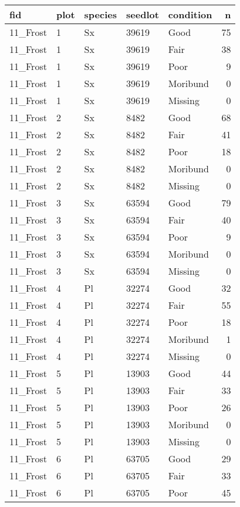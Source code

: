 \documentclass[
]{article}
\begin{document}
\begin{tabular}{l|l|l|l|l|r}
\hline
fid & plot & species & seedlot & condition & n\\
\hline
11\_Frost & 1 & Sx & 39619 & Good & 75\\
\hline
11\_Frost & 1 & Sx & 39619 & Fair & 38\\
\hline
11\_Frost & 1 & Sx & 39619 & Poor & 9\\
\hline
11\_Frost & 1 & Sx & 39619 & Moribund & 0\\
\hline
11\_Frost & 1 & Sx & 39619 & Missing & 0\\
\hline
11\_Frost & 2 & Sx & 8482 & Good & 68\\
\hline
11\_Frost & 2 & Sx & 8482 & Fair & 41\\
\hline
11\_Frost & 2 & Sx & 8482 & Poor & 18\\
\hline
11\_Frost & 2 & Sx & 8482 & Moribund & 0\\
\hline
11\_Frost & 2 & Sx & 8482 & Missing & 0\\
\hline
11\_Frost & 3 & Sx & 63594 & Good & 79\\
\hline
11\_Frost & 3 & Sx & 63594 & Fair & 40\\
\hline
11\_Frost & 3 & Sx & 63594 & Poor & 9\\
\hline
11\_Frost & 3 & Sx & 63594 & Moribund & 0\\
\hline
11\_Frost & 3 & Sx & 63594 & Missing & 0\\
\hline
11\_Frost & 4 & Pl & 32274 & Good & 32\\
\hline
11\_Frost & 4 & Pl & 32274 & Fair & 55\\
\hline
11\_Frost & 4 & Pl & 32274 & Poor & 18\\
\hline
11\_Frost & 4 & Pl & 32274 & Moribund & 1\\
\hline
11\_Frost & 4 & Pl & 32274 & Missing & 0\\
\hline
11\_Frost & 5 & Pl & 13903 & Good & 44\\
\hline
11\_Frost & 5 & Pl & 13903 & Fair & 33\\
\hline
11\_Frost & 5 & Pl & 13903 & Poor & 26\\
\hline
11\_Frost & 5 & Pl & 13903 & Moribund & 0\\
\hline
11\_Frost & 5 & Pl & 13903 & Missing & 0\\
\hline
11\_Frost & 6 & Pl & 63705 & Good & 29\\
\hline
11\_Frost & 6 & Pl & 63705 & Fair & 33\\
\hline
11\_Frost & 6 & Pl & 63705 & Poor & 45\\

\end{tabular}
\end{document}
